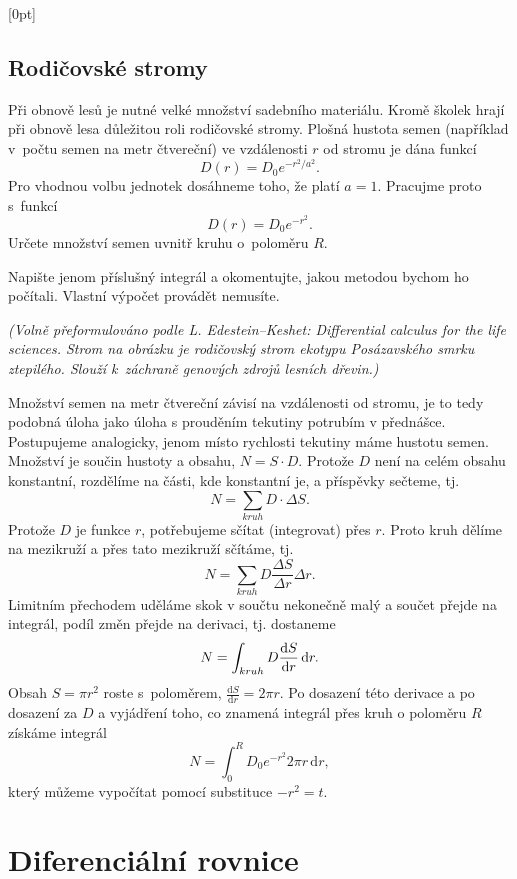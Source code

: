 \konec

\stranka

[0pt]


\subsection{Rodičovské stromy} Při obnově lesů je nutné velké množství
sadebního materiálu. Kromě školek hrají při obnově lesa důležitou roli
rodičovské stromy. Plošná hustota semen (například v počtu semen na
metr čtvereční) ve vzdálenosti $r$ od stromu je dána
funkcí $$D(r)=D_0 e^{-r^2/a^2}.$$ Pro vhodnou volbu jednotek dosáhneme
toho, že platí $a=1$. Pracujme proto s funkcí
$$D(r)=D_0 e^{-r^2}.$$ Určete množství semen uvnitř kruhu o poloměru $R$.

Napište jenom příslušný integrál a okomentujte, jakou metodou bychom
ho počítali. Vlastní výpočet provádět nemusíte.

\textit{(Volně přeformulováno podle L. Edestein--Keshet: Differential calculus
for the life sciences. Strom na obrázku je rodičovský strom ekotypu
Posázavského smrku ztepilého. Slouží k záchraně genových zdrojů
lesních dřevin.)}

\reseni Množství semen na metr čtvereční závisí na vzdálenosti od
stromu, je to tedy podobná úloha jako úloha s prouděním tekutiny
potrubím v přednášce. Postupujeme analogicky, jenom místo rychlosti tekutiny
máme hustotu semen.  Množství je součin hustoty a obsahu, $N=S\cdot D$. Protože $D$ není na celém obsahu konstantní, rozdělíme na části, kde konstantní je, a příspěvky sečteme, tj. $$N=\sum_{kruh} D\cdot\Delta S.$$ Protože $D$ je funkce $r$, potřebujeme sčítat (integrovat) přes $r$. Proto kruh dělíme na mezikruží a přes tato mezikruží sčítáme, tj. 
$$N=\sum_{kruh} D \frac{\Delta S}{\Delta r}\Delta r.$$ Limitním přechodem uděláme skok v součtu nekonečně malý a součet přejde na integrál, podíl změn přejde na derivaci, tj. dostaneme
$$N=\int_{kruh} D \frac{\mathrm{d}S}{\mathrm{d}r}\,\mathrm d r.$$
Obsah $S=\pi r^2$
roste s poloměrem, $\frac {\mathrm dS}{\mathrm dr}=2\pi r$. Po dosazení této derivace a po dosazení za $D$ a vyjádření toho, co znamená integrál přes kruh o poloměru $R$ získáme integrál
$$N=\int _0^R D_0e^{-r^2}2\pi r\,\mathrm dr,$$
který můžeme vypočítat pomocí substituce $-r^2=t$.

\konec


\stranka
\section{Diferenciální rovnice}

